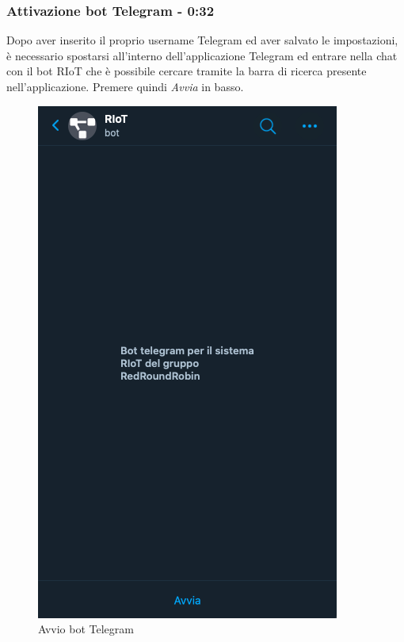 	\subsubsection{Attivazione bot Telegram - 0:32}
	Dopo aver inserito il proprio username Telegram ed aver salvato le impostazioni, è necessario spostarsi all'interno dell'applicazione Telegram ed entrare nella chat con il bot RIoT che è possibile cercare tramite la barra di ricerca presente nell'applicazione.
	Premere quindi \textit{Avvia} in basso.

		\begin{figure}[H]
		\centering
		\includegraphics[scale=0.600]{res/images/membro/avvioBot.png}
		\caption{Avvio bot Telegram}
	\end{figure}
